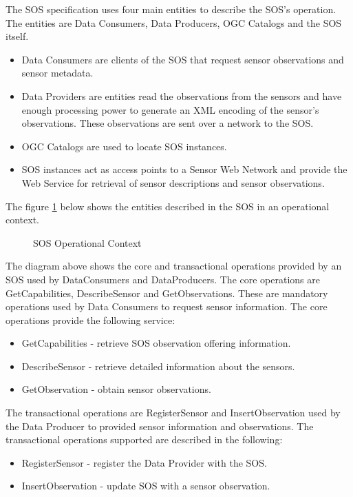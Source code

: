 \documentclass[]{final_report}
\begin{document}
The SOS specification uses four main entities to describe the SOS's operation. The entities are Data Consumers, Data Producers, OGC Catalogs and the SOS itself. 
\begin{itemize}
\item Data Consumers are clients of the SOS that request sensor observations and sensor metadata. 
\item Data Providers are entities read the observations from the sensors and have enough processing power to generate an XML encoding of the sensor's observations. These observations are sent over a network to the SOS. 
\item OGC Catalogs are used to locate SOS instances. 
\item SOS instances act as access points to a Sensor Web Network and provide the Web Service for retrieval of sensor descriptions and sensor observations.
\end{itemize}
The figure \ref{fig:SOSoperationContext} below shows the entities described in the SOS in an operational context.
\begin{figure}[h]
\caption{SOS Operational Context}\label{fig:SOSoperationContext}
\end{figure}

The diagram above shows the core and transactional operations provided by an SOS used by DataConsumers and DataProducers. The core operations are GetCapabilities, DescribeSensor and GetObservations. These are mandatory operations used by Data Consumers to request sensor information.  The core operations provide the following service:
 \begin{itemize}
\item GetCapabilities  -    retrieve SOS observation offering information.
\item DescribeSensor -    retrieve detailed information about the sensors.
\item GetObservation -   obtain sensor observations.
\end{itemize}

The transactional operations are RegisterSensor and InsertObservation used by the Data Producer to provided sensor information and observations. The transactional operations supported are described in the following:
 \begin{itemize}
\item RegisterSensor -  register the Data Provider with the SOS.
\item InsertObservation - update SOS with a sensor observation.
\end{itemize}
\end{document}
